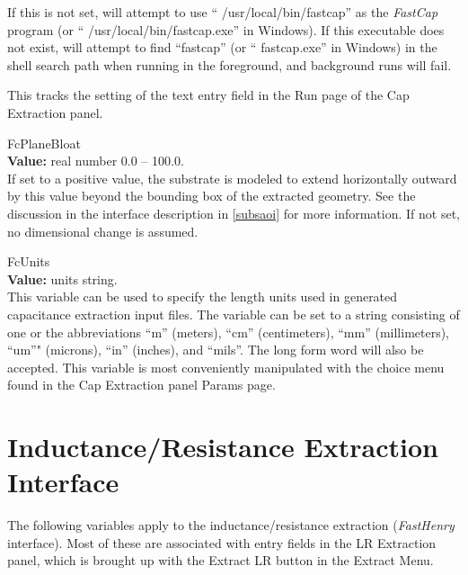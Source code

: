 \begin{description}
If this is not set, {\Xic} will attempt to use ``{\vt
/usr/local/bin/fastcap}'' as the {\it FastCap} program (or ``{\vt
/usr/local/bin/fastcap.exe}'' in Windows).  If this executable does
not exist, {\Xic} will attempt to find ``{\vt fastcap}'' (or ``{\vt
fastcap.exe}'' in Windows) in the shell search path when running in
the foreground, and background runs will fail.

This tracks the setting of the text entry field in the {\cb Run}
page of the {\cb Cap Extraction} panel.

\item{\et FcPlaneBloat}\\
{\bf Value:} real number 0.0 -- 100.0.\\
If set to a positive value, the substrate is modeled to extend
horizontally outward by this value beyond the bounding box of the
extracted geometry.  See the discussion in the interface description
in \ref{subsaoi} for more information.  If not set, no dimensional
change is assumed.

\item{\et FcUnits}\\
{\bf Value:} units string.\\
This variable can be used to specify the length units used in
generated capacitance extraction input files.  The variable can be set
to a string consisting of one or the abbreviations ``{\vt m}''
(meters), ``{\vt cm}'' (centimeters), ``{\vt mm}'' (millimeters),
``{\vt um}''" (microns), ``{\vt in}'' (inches), and ``{\vt mils}''. 
The long form word will also be accepted.  This variable is most
conveniently manipulated with the choice menu found in the {\cb Cap
Extraction} panel {\cb Params} page.
\end{description}


\section{Inductance/Resistance Extraction Interface}
\label{fhvars}
The following variables apply to the inductance/resistance extraction
({\it FastHenry} interface).  Most of these are associated with entry
fields in the {\cb LR Extraction} panel, which is brought up
with the {\cb Extract LR} button in the {\cb Extract Menu}.

